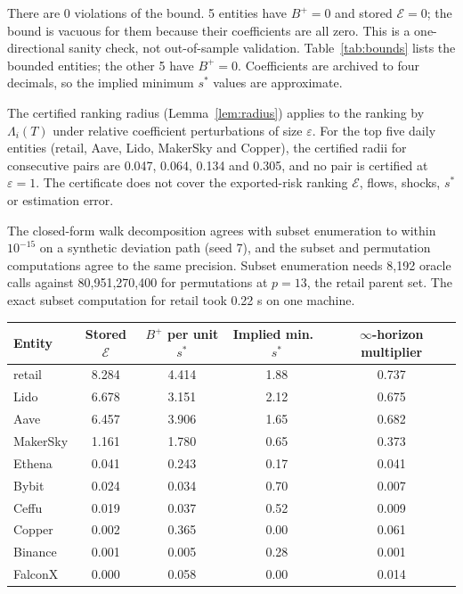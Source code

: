 \documentclass[referee,pdflatex,sn-mathphys-ay]{sn-jnl}
\newcommand{\fitbox}{\ifdim\wd\tabbox>\linewidth\resizebox{\linewidth}{!}{\usebox{\tabbox}}\else\usebox{\tabbox}\fi}%
\theoremstyle{thmstyleone}%
\theoremstyle{thmstyletwo}%
\theoremstyle{thmstylethree}%
\begin{document}
\begin{appendices}
There are 0 violations of the bound. 5 entities have $B^+=0$ and stored $\mathcal{E}=0$; the bound is vacuous for them
because their coefficients are all zero. This is a one-directional sanity check, not out-of-sample validation. Table~\ref{tab:bounds} lists the bounded entities; the other 5 have $B^+=0$. Coefficients are archived to four decimals, so the implied minimum
$s^\ast$ values are approximate.

The certified ranking radius (Lemma~\ref{lem:radius}) applies to the ranking by $\Lambda_i(T)$ under relative coefficient
perturbations of size $\varepsilon$. For the top five daily entities (retail, Aave, Lido, MakerSky and Copper), the certified radii
for consecutive pairs are 0.047, 0.064, 0.134 and 0.305, and no pair is certified at $\varepsilon=1$.
The certificate does not cover the exported-risk ranking $\mathcal{E}$, flows, shocks, $s^\ast$ or estimation error.

The closed-form walk decomposition agrees with subset enumeration to within $10^{-15}$ on a synthetic deviation path (seed
7), and the subset and permutation computations agree to the same precision. Subset enumeration needs 8{,}192 oracle calls
against 80{,}951{,}270{,}400 for permutations at $p=13$, the retail parent set. The exact subset computation for retail took 0.22 s on one machine.

\begin{lrbox}{\tabbox}\footnotesize\setlength{\tabcolsep}{3pt}%
\begin{tabular}{@{}lcccc@{}}
\toprule
\textbf{Entity} & \textbf{Stored $\mathcal{E}$} & \textbf{$B^+$ per unit $s^\ast$} & \textbf{Implied min.\ $s^\ast$} & \textbf{$\infty$-horizon multiplier}\\
\midrule
retail & 8.284 & 4.414 & 1.88 & 0.737 \\
Lido & 6.678 & 3.151 & 2.12 & 0.675 \\
Aave & 6.457 & 3.906 & 1.65 & 0.682 \\
MakerSky & 1.161 & 1.780 & 0.65 & 0.373 \\
Ethena & 0.041 & 0.243 & 0.17 & 0.041 \\
Bybit & 0.024 & 0.034 & 0.70 & 0.007 \\
Ceffu & 0.019 & 0.037 & 0.52 & 0.009 \\
Copper & 0.002 & 0.365 & 0.00 & 0.061 \\
Binance & 0.001 & 0.005 & 0.28 & 0.001 \\
FalconX & 0.000 & 0.058 & 0.00 & 0.014 \\
\bottomrule
\end{tabular}
\end{lrbox}
\begin{tableorg}[tbp]
\centering
\caption{Flow-free bounds on exported risk, daily specification ($T=7$), bounded entities only.}
\label{tab:bounds}
\fitbox
\end{tableorg}

\end{appendices}

{\footnotesize\linespread{1.05}\selectfont
}
\end{document}
